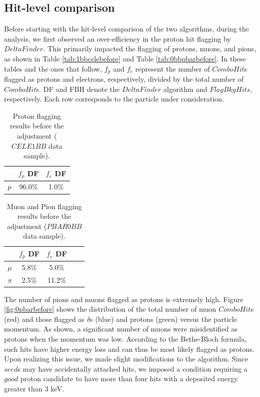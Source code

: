 \subsection{Hit-level comparison}
Before starting with the hit-level comparison of the two algorithms, during the analysis, 
we first observed an over-efficiency in the proton hit flagging by $DeltaFinder$. 
This primarily impacted the flagging of protons, muons, and pions, as shown in 
Table \ref{tab:1bbcelebefore} and Table \ref{tab:0bbpbarbefore}. 
In these tables and the ones that follow, $f_p$ and $f_e$ represent 
the number of $ComboHit$s flagged as protons and electrons, respectively, 
divided by the total number of $ComboHit$s. DF and FBH denote the $DeltaFinder$ 
algorithm and $FlagBkgHits$, respectively. Each row corresponds to the particle 
under consideration.
\begin{center}
    \begin{table}[h!]
    \centering
    \renewcommand{\arraystretch}{1.}
    \begin{tabular}{| c | c | c |} 
    \hline
    & $f_{p}$ DF & $f_{e}$ DF  \\
    \hline
    $p$     & 96.0\% & 1.0\% \\
    \hline
    \end{tabular}
    \caption[Proton flagging results before the adjustment.]{Proton 
    flagging results before the adjustment ($CELE1BB$ data sample).}
    \end{table}\label{tab:1bbcelebefore}
\end{center}
    
\begin{center}
    \begin{table}[h!]
        \centering
        \renewcommand{\arraystretch}{1.}
        \begin{tabular}{| c | c | c | c | c|} 
        \hline
        &   $f_{p}$ DF &   $f_{e}$ DF\\
        \hline
        $\mu$ &  5.8\%  & 5.0\%\\
        \hline
        $\pi$ & 2.5\% &  11.2\%\\
        \hline
        \end{tabular}
        \caption[Muon and Pion flagging results before the adjustment.]{Muon 
        and Pion flagging results before the adjustment ($PBAR0BB$ data sample).}
    \end{table}\label{tab:0bbpbarbefore}
\end{center}
The number of pions and muons flagged as protons is extremely high. 
Figure \ref{fig:0pbarbefore} shows the distribution of the total 
number of muon $ComboHit$s (red) and those flagged as $\delta$s (blue) 
and protons (green) versus the particle momentum. 
As shown, a significant number of muons were misidentified 
as protons when the momentum was low. 
According to the Bethe-Bloch formula, such hits have 
higher energy loss and can thus be most likely flagged as 
protons. Upon realizing this issue, we made slight modifications to the 
algorithm. Since $seed$s may have accidentally attached hits, we imposed a 
condition requiring a $good$ proton candidate to have more than four 
hits with a deposited energy greater than 3 keV.


